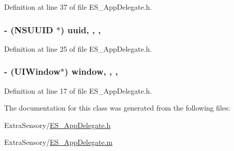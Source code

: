 Definition at line 37 of file E\+S\+\_\+\+App\+Delegate.\+h.

\hypertarget{interface_e_s___app_delegate_a8ee3cd0a248c6c4278d7a47f1a209de8}{
\subsubsection[{uuid}]{\setlength{\rightskip}{0pt plus 5cm}-\/ (N\+S\+U\+U\+I\+D $\ast$) uuid\hspace{0.3cm}{\ttfamily [read]}, {\ttfamily [write]}, {\ttfamily [nonatomic]}, {\ttfamily [strong]}}}\label{interface_e_s___app_delegate_a8ee3cd0a248c6c4278d7a47f1a209de8}


Definition at line 25 of file E\+S\+\_\+\+App\+Delegate.\+h.

\hypertarget{interface_e_s___app_delegate_a23e2341825c59a4c6f347bea8b993c93}{
\subsubsection[{window}]{\setlength{\rightskip}{0pt plus 5cm}-\/ (U\+I\+Window$\ast$) window\hspace{0.3cm}{\ttfamily [read]}, {\ttfamily [write]}, {\ttfamily [nonatomic]}, {\ttfamily [strong]}}}\label{interface_e_s___app_delegate_a23e2341825c59a4c6f347bea8b993c93}


Definition at line 17 of file E\+S\+\_\+\+App\+Delegate.\+h.



The documentation for this class was generated from the following files\+:\begin{DoxyCompactItemize}
\item 
Extra\+Sensory/\hyperlink{_e_s___app_delegate_8h}{E\+S\+\_\+\+App\+Delegate.\+h}\item 
Extra\+Sensory/\hyperlink{_e_s___app_delegate_8m}{E\+S\+\_\+\+App\+Delegate.\+m}\end{DoxyCompactItemize}
